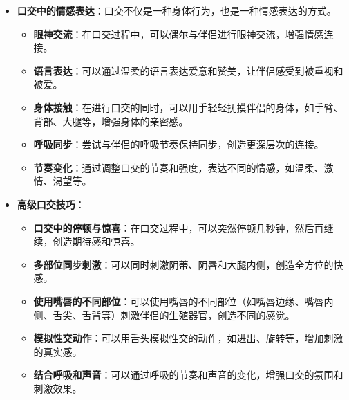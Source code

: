 \documentclass[12pt,UTF8]{ctexbook}
\begin{document}
\begin{itemize}
\begin{itemize}
    \item \textbf{跳蛋配合口交}：可以将跳蛋插入阴道，同时进行口交，增加内部和外部的双重刺激。
    \item \textbf{口交套与振动器结合}：可以使用带有振动功能的口交套，增强口交的刺激效果。
    \item \textbf{温度玩具配合口交}：可以使用预热或预冷的性玩具，与口交的温度刺激相结合，创造更丰富的感觉体验。
    \item \textbf{使用注意事项}：在结合使用性玩具时，应确保玩具清洁卫生，使用水性润滑剂，并且尊重伴侣的感受和边界。
    \end{itemize}
  \item \textbf{口交中的情感表达}：口交不仅是一种身体行为，也是一种情感表达的方式。
    \begin{itemize}
    \item \textbf{眼神交流}：在口交过程中，可以偶尔与伴侣进行眼神交流，增强情感连接。
    \item \textbf{语言表达}：可以通过温柔的语言表达爱意和赞美，让伴侣感受到被重视和被爱。
    \item \textbf{身体接触}：在进行口交的同时，可以用手轻轻抚摸伴侣的身体，如手臂、背部、大腿等，增强身体的亲密感。
    \item \textbf{呼吸同步}：尝试与伴侣的呼吸节奏保持同步，创造更深层次的连接。
    \item \textbf{节奏变化}：通过调整口交的节奏和强度，表达不同的情感，如温柔、激情、渴望等。
    \end{itemize}
  \item \textbf{高级口交技巧}：
    \begin{itemize}
    \item \textbf{口交中的停顿与惊喜}：在口交过程中，可以突然停顿几秒钟，然后再继续，创造期待感和惊喜。
    \item \textbf{多部位同步刺激}：可以同时刺激阴蒂、阴唇和大腿内侧，创造全方位的快感。
    \item \textbf{使用嘴唇的不同部位}：可以使用嘴唇的不同部位（如嘴唇边缘、嘴唇内侧、舌尖、舌背等）刺激伴侣的生殖器官，创造不同的感觉。
    \item \textbf{模拟性交动作}：可以用舌头模拟性交的动作，如进出、旋转等，增加刺激的真实感。
    \item \textbf{结合呼吸和声音}：可以通过呼吸的节奏和声音的变化，增强口交的氛围和刺激效果。
    \end{itemize}
  \end{itemize}
\end{document}
